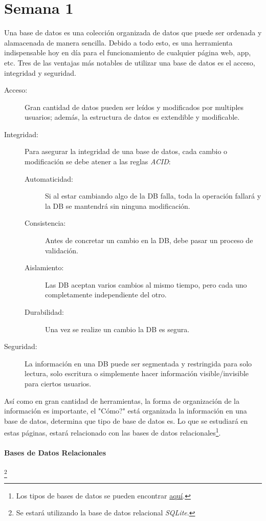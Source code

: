 \section{Semana 1}

Una base de datos es una colección organizada de datos que puede ser ordenada y alamacenada de manera sencilla. Debido a todo esto, es una herramienta indispensable hoy en día para el funcionamiento de cualquier página web, app, etc. Tres de las ventajas más notables de utilizar una base de datos es el acceso, integridad y seguridad.

\begin{description}
	\item[Acceso: ] Gran cantidad de datos pueden ser leídos y modificados por multiples usuarios; además, la estructura de datos es extendible y modificable.
	\item[Integridad: ] Para asegurar la integridad de una base de datos, cada cambio o modificación se debe atener a las reglas \textit{ACID}:
	\begin{description}
		\item[Automaticidad: ] Si al estar cambiando algo de la DB falla, toda la operación fallará y la DB se mantendrá sin ninguna modificación.
		\item[Consistencia: ] Antes de concretar un cambio en la DB, debe pasar un proceso de validación.
		\item[Aislamiento: ] Las DB aceptan varios cambios al mismo tiempo, pero cada uno completamente independiente del otro.
		\item[Durabilidad: ] Una vez se realize un cambio la DB es segura.
	\end{description}
	\item[Seguridad: ] La información en una DB puede ser segmentada y restringida para solo lectura, solo escritura o simplemente hacer información visible/invisible para ciertos usuarios.
\end{description}

Así como en gran cantidad de herramientas, la forma de organización de la información es importante, el "Cómo?" está organizada la información en una base de datos, determina que tipo de base de datos es. Lo que se estudiará en estas páginas, estará relacionado con las bases de datos relacionales\footnote{Los tipos de bases de datos se pueden encontrar \href{https://www.tutorialspoint.com/Types-of-databases}{aquí}.}.

\paragraph{Bases de Datos Relacionales}\footnote{Se estará utilizando la base de datos relacional \textit{SQLite}.}


